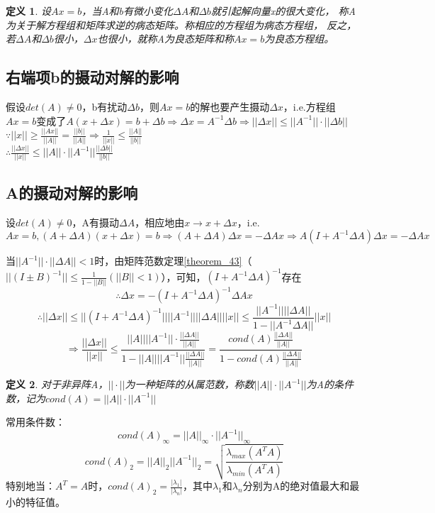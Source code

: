 \documentclass[a4paper]{article}
\newtheorem{definition}{定义}[section]
\begin{document}
\begin{definition}
  设$Ax=b$，当A和b有微小变化$\Delta A$和$\Delta b$就引起解向量x的很大变化，
  称A为关于解方程组和矩阵求逆的病态矩阵。称相应的方程组为病态方程组，
  反之，若$\Delta A$和$\Delta b$很小，$\Delta x$也很小，就称A为良态矩阵和称$Ax=b$为良态方程组。
\end{definition}

\subsection{右端项b的摄动对解的影响}
假设$det(A)\neq 0$，b有扰动$\Delta b$，则$Ax=b$的解也要产生摄动$\Delta x$，i.e.方程组$Ax=b$变成了$A(x+\Delta x)=b+\Delta b\Rightarrow 
\Delta x =A^{-1}\Delta b \Rightarrow ||\Delta x||\le ||A^{-1}||\cdot||\Delta b|| $ \\
$\because ||x||\ge \frac{||Ax||}{||A||}=\frac{||b||}{||A||}\Rightarrow \frac{1}{||x||}\le \frac{||A||}{||b||}$ \\
$\therefore \frac{||\Delta x||}{||x||} \le ||A||\cdot||A^{-1}||\frac{||\Delta b||}{||b||}$

\subsection{A的摄动对解的影响}
设$det(A)\neq 0$，A有摄动$\Delta A$，相应地由$x\rightarrow x+\Delta x$，i.e. 
$Ax=b, (A+\Delta A)(x+\Delta x)=b\Rightarrow (A+\Delta A)\Delta x = -\Delta Ax\Rightarrow A(I+A^{-1}\Delta A)\Delta x = -\Delta Ax$

当$||A^{-1}||\cdot||\Delta A||<1$时，由矩阵范数定理\ref{theorem_43}（$||(I\pm B)^{-1}||\le \frac{1}{1-||B||} (||B||<1)$），可知，$(I+A^{-1}\Delta A)^{-1}$存在
$$\therefore \Delta x = -(I+A^{-1}\Delta A)^{-1}\Delta Ax $$
$$\therefore ||\Delta x||\le ||(I+A^{-1}\Delta A)^{-1}||||A^{-1}||||\Delta A||||x||\le \frac{||A^{-1}||||\Delta A||}{1-||A^{-1}\Delta A||}||x|| $$
$$\Rightarrow \frac{||\Delta x||}{||x||} \le \frac{||A||||A^{-1}||\cdot\frac{||\Delta A||}{||A||}}{1-||A||||A^{-1}||\frac{||\Delta A||}{||A||}} = \frac{cond(A)\frac{||\Delta A||}{||A||}}{1-cond(A)\frac{||\Delta A||}{||A||}}$$

\begin{definition}
  对于非异阵A，$||\cdot||$为一种矩阵的从属范数，称数$||A||\cdot||A^{-1}||$为A的条件数，记为$cond(A)=||A||\cdot||A^{-1}||$
\end{definition}

常用条件数：
$$cond(A)_\infty =||A||_\infty\cdot||A^{-1}||_\infty $$
$$cond(A)_2 = ||A||_2||A^{-1}||_2=\sqrt{\frac{\lambda_{max}(A^TA)}{\lambda_{min}(A^TA)}}$$
特别地当：$A^T=A$时，$cond(A)_2=\frac{|\lambda_1|}{|\lambda_n|}$，其中$\lambda_1$和$\lambda_n$分别为A的绝对值最大和最小的特征值。
\end{document}

